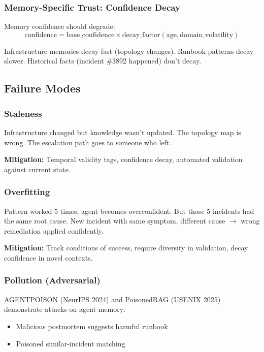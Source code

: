 \subsubsection{Memory-Specific Trust: Confidence Decay}

Memory confidence should degrade:
\begin{equation}
\text{confidence} = \text{base\_confidence} \times \text{decay\_factor}(\text{age}, \text{domain\_volatility})
\end{equation}

Infrastructure memories decay fast (topology changes). Runbook patterns decay slower. Historical facts (incident \#3892 happened) don't decay.

\subsection{Failure Modes}
\label{subsec:memory-failures}

\subsubsection{Staleness}

Infrastructure changed but knowledge wasn't updated. The topology map is wrong. The escalation path goes to someone who left.

\textbf{Mitigation:} Temporal validity tags, confidence decay, automated validation against current state.

\subsubsection{Overfitting}

Pattern worked 5 times, agent becomes overconfident. But those 5 incidents had the same root cause. New incident with same symptom, different cause $\rightarrow$ wrong remediation applied confidently.

\textbf{Mitigation:} Track conditions of success, require diversity in validation, decay confidence in novel contexts.

\subsubsection{Pollution (Adversarial)}

AGENTPOISON (NeurIPS 2024) and PoisonedRAG (USENIX 2025) demonstrate attacks on agent memory:
\begin{itemize}
    \item Malicious postmortem suggests harmful runbook
    \item Poisoned similar-incident matching
\end{itemize}

